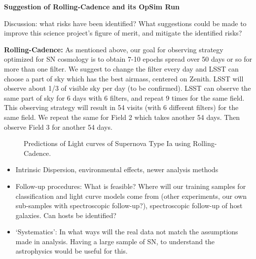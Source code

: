 



{\bf Suggestion of Rolling-Cadence and its OpSim Run}

Discussion: what risks have been identified? What suggestions could be
made to improve this science project's figure of merit, and mitigate
the identified risks?

{\bf Rolling-Cadence:} As mentioned above, our goal for observing strategy optimized for SN cosmology
is to obtain 7-10 epochs spread over 50 days or so for more than one filter. We suggest to change the filter 
every day and LSST can choose a part of sky which has the best airmass, centered on Zenith.
LSST will observe about 1/3 of visible sky per day (to be confirmed). LSST can observe the same part of sky for 6 days 
with 6 filters, and repeat 9 times for the same field. This observing strategy will result in 54 visits (with 6 different filters) for the same field. We repeat the same for Field 2 which takes another 54 days. Then observe Field 3 for another 54 days.

\begin{figure}[tbh!]
\vskip -1.3in
\vskip -1.3in
\caption{Predictions of Light curves of Supernova Type Ia using Rolling-Cadence.
}
\label{fig:SNIaLCopsimmainnew}
\end{figure}



\begin{itemize}
\item Intrinsic Dispersion, environmental effects, newer analysis methods
\item Follow-up procedures: What is feasible? Where will our training samples for classification and light curve models come from (other experiments, our own 
sub-samples with spectroscopic follow-up?), spectroscopic follow-up of host galaxies. Can hosts be identified?
\item `Systematics': In what ways will the real data not match the assumptions made in analysis. Having a large sample of SN, to understand the astrophysics would be useful for this. 
\end{itemize}



\navigationbar

